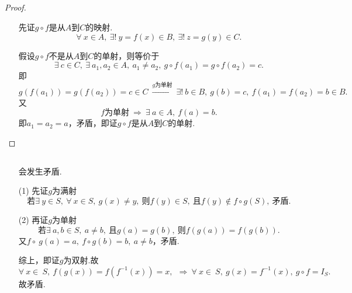 \documentclass[UTF8]{ctexart}
\begin{document}
\subsection{}   %
\begin{proof}
    
    \begin{enumerate}
        \item []
        \item []先证$g\circ f$是从$A$到$C$的映射.
        \[
            \forall\ x\in A,\ \exists !\ y=f(x)\in B,\ \exists !\ z=g(y)\in C.
        \]
        \item []假设$g\circ f$不是从$A$到$C$的单射，则等价于
        \[
            \exists\ c\in C,\ \exists\ a_1,a_2\in A,\ a_1\neq a_2,\
            g\circ f(a_1)=g\circ f(a_2)=c.
        \]
        即
        \[
            g(f(a_1))=g(f(a_2))=c\in C
            \ \xrightarrow{g为单射}\ 
            \exists !\ b\in B,\ g(b)=c,\ 
            f(a_1)=f(a_2)=b\in B.    
        \]
        又
        \[
            f\mbox{为单射}
            \ \Rightarrow\ 
            \exists\ a\in A,\ f(a)=b.    
        \]
        即$a_1 = a_2 = a$，矛盾，即证$g\circ f$是从$A$到$C$的单射.
    \end{enumerate}
\end{proof}

\subsection{}   %
\begin{enumerate}
    \item []会发生矛盾.
    \item [(1)]先证$g$为满射
    \[
        \mbox{若}\exists\ y\in S,\ \forall\ x\in S,\ g(x)\neq y,\    
        \mbox{则}f(y)\in S,\ \mbox{且}f(y)\notin f\circ g (S),\ \mbox{矛盾}.
    \]

    \item [(2)]再证$g$为单射
    \[
        \mbox{若}\exists\ a,b\in S,\ a\neq b,\ \mbox{且}g(a)=g(b),\ 
        \mbox{则}f(g(a))=f(g(b)).
    \]
    又$f\circ\ g (a)=a,\ f\circ g(b)=b,\ a\neq b$，矛盾.
    \item []综上，即证$g$为双射.故
    \[
        \forall\ x\in\ S,\ f(g(x))=f(f^{-1}(x))=x,\ 
        \ \Rightarrow\ 
        \forall\ x\in\ S,\ g(x)=f^{-1}(x),\ g\circ f=I_S.    
    \]
    故矛盾.
\end{enumerate}
\end{document}
